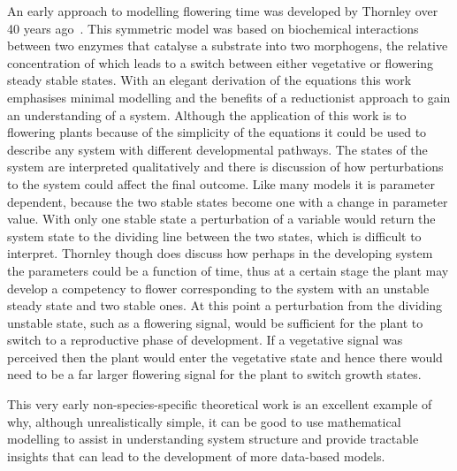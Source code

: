 An early approach to modelling flowering time was developed by Thornley over 40 years ago~\cite{thornley1972}.
This symmetric model was based on biochemical interactions between two enzymes that catalyse a substrate into two morphogens, the relative concentration of which leads to a switch between either vegetative or flowering steady stable states.
With an elegant derivation of the equations this work emphasises minimal modelling and the benefits of a reductionist approach to gain an understanding of a system.
Although the application of this work is to flowering plants because of the simplicity of the equations it could be used to describe any system with different developmental pathways.
The states of the system are interpreted qualitatively and there is discussion of how perturbations to the system could affect the final outcome.
Like many models it is parameter dependent, because the two stable states become one with a change in parameter value.
With only one stable state a perturbation of a variable would return the system state to the dividing line between the two states, which is difficult to interpret.
Thornley though does discuss how perhaps in the developing system the parameters could be a function of time, thus at a certain stage the plant may develop a competency to flower corresponding to the system with an unstable steady state and two stable ones.
At this point a perturbation from the dividing unstable state, such as a flowering signal, would be sufficient for the plant to switch to a reproductive phase of development.
If a vegetative signal was perceived then the plant would enter the vegetative state and hence there would need to be a far larger flowering signal for the plant to switch growth states.

This very early non-species-specific theoretical work is an excellent example of why, although unrealistically simple, it can be good to use mathematical modelling to assist in understanding system structure and provide tractable insights that can lead to the development of more data-based models.

